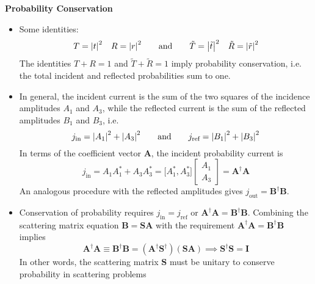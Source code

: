 \documentclass[11pt, a4paper]{article}
\newcommand{\eqtext}[1]{\qquad \text{#1} \qquad}
\renewcommand{\vec}[1]{\bm{#1}} %
\newcommand{\mat}[1]{\mathbf{#1}} %
\begin{document}
\textbf{Probability Conservation}
\begin{itemize}
	\item Some identities:
	\begin{equation*}
		T = \abs{t}^{2} \quad R = \abs{r}^{2} \eqtext{and} 		\tilde{T} = \abs{\tilde{t}}^{2} \quad \tilde{R} = \abs{\tilde{r}}^{2}
	\end{equation*}
	The identities $ T + R = 1 $ and $ \tilde{T} + \tilde{R} = 1 $ imply probability conservation, i.e. the total incident and reflected probabilities sum to one. 
	
	\item In general, the incident current is the sum of the two squares of the incidence amplitudes $ A_{1} $ and $ A_{3} $, while the reflected current is the sum of the reflected amplitudes $ B_{1} $ and $ B_{3} $, i.e.
	\begin{equation*}
		j_{\text{in}} = \abs{A_{1}}^{2} + \abs{A_{3}}^{2} \eqtext{and} j_{\text{ref}} = \abs{B_{1}}^{2} + \abs{B_{3}}^{2}
	\end{equation*}
	In terms of the coefficient vector $ \vec{A} $, the incident probability current is
	\begin{equation*}
		j_{\text{in}} = A_{1}A_{1}^{*} + A_{3}A_{3}^{*} = \big[A_{1}^{*}, A_{3}^{*}\big]
		\begin{bmatrix}
			A_{1}\\
			A_{3}
		\end{bmatrix}
		= \vec{A}^{\dagger}\vec{A}
	\end{equation*}
	An analogous procedure with the reflected amplitudes gives $ j_{\text{out}} = \vec{B}^{\dagger}\vec{B} $. 
	
	
	\item Conservation of probability requires $ j_{\text{in}} = j_{\text{ref}} $ or $ \vec{A}^{\dagger}\vec{A} = \vec{B}^{\dagger}\vec{B} $. Combining the scattering matrix equation $ \vec{B} = \mat{S}\vec{A} $ with the requirement $ \vec{A}^{\dagger}\vec{A} = \vec{B}^{\dagger}\vec{B} $ implies
	\begin{equation*}
		\vec{A}^{\dagger}\vec{A} \equiv \vec{B}^{\dagger}\vec{B} = (\vec{A}^{\dagger}\mat{S}^{\dagger})(\mat{S}\vec{A}) \implies \vec{S}^{\dagger}\mat{S} = \mat{I}
	\end{equation*}
	In other words, the scattering matrix $ \mat{S} $ must be unitary to conserve probability in scattering problems
\end{itemize}
\end{document}
